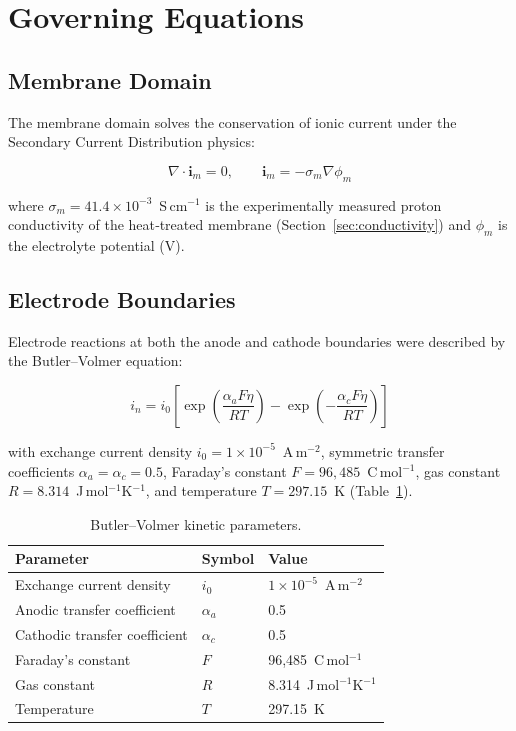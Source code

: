 \documentclass[12pt,a4paper]{report}
\begin{document}
\section{Governing Equations}

\subsection{Membrane Domain}

The membrane domain solves the conservation of ionic current 
under the Secondary Current Distribution physics:

\begin{equation}
\nabla \cdot \mathbf{i}_m = 0, \qquad 
\mathbf{i}_m = -\sigma_m \nabla \phi_m
\end{equation}

where \(\sigma_m = 41.4 \times 10^{-3}\)~S\,cm\(^{-1}\) is the 
experimentally measured proton conductivity of the heat‑treated 
membrane (Section~\ref{sec:conductivity}) and \(\phi_m\) is the 
electrolyte potential (V).

\subsection{Electrode Boundaries}

Electrode reactions at both the anode and cathode boundaries 
were described by the Butler--Volmer equation:

\begin{equation}
i_n = i_0 \left[
\exp\!\left(\frac{\alpha_a F \eta}{RT}\right) -
\exp\!\left(-\frac{\alpha_c F \eta}{RT}\right)
\right]
\end{equation}

with exchange current density \(i_0 = 1 \times 10^{-5}\)~A\,m\(^{-2}\), 
symmetric transfer coefficients \(\alpha_a = \alpha_c = 0.5\), 
Faraday's constant \(F = 96{,}485\)~C\,mol\(^{-1}\), gas constant 
\(R = 8.314\)~J\,mol\(^{-1}\)K\(^{-1}\), and temperature 
\(T = 297.15\)~K (Table~\ref{tab:bv-params}).

\begin{table}[h]
\centering
\caption{Butler--Volmer kinetic parameters.}
\label{tab:bv-params}
\begin{tabular}{lll}
\toprule
Parameter & Symbol & Value \\
\midrule
Exchange current density & $i_0$ & $1 \times 10^{-5}$~A\,m$^{-2}$ \\
Anodic transfer coefficient & $\alpha_a$ & 0.5 \\
Cathodic transfer coefficient & $\alpha_c$ & 0.5 \\
Faraday's constant & $F$ & 96{,}485~C\,mol$^{-1}$ \\
Gas constant & $R$ & 8.314~J\,mol$^{-1}$K$^{-1}$ \\
Temperature & $T$ & 297.15~K \\
\bottomrule
\end{tabular}
\end{table}
\end{document}
